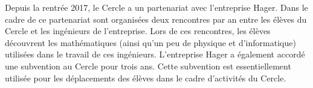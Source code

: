 \documentclass[11pt,notitlepage]{article}
\begin{document}
Depuis la rentr\'ee 2017, le Cercle a un partenariat avec l'entreprise Hager. Dans le cadre de ce partenariat sont organis\'ees deux rencontres par an entre les \'el\`eves du Cercle et 
les ing\'enieurs de l'entreprise. Lors de ces rencontres, les \'el\`eves d\'ecouvrent les math\'ematiques (ainsi qu'un peu de physique et d'informatique) utilis\'ees dans le travail 
de ces ing\'enieurs. L'entreprise Hager a \'egalement accord\'e une subvention au Cercle pour trois ans. Cette subvention est essentiellement utilis\'ee pour les d\'eplacements des 
\'el\`eves dans le cadre d'activit\'es du Cercle.


%	
%	
%	
%	
%	
%	
%	
%	
\end{document}
